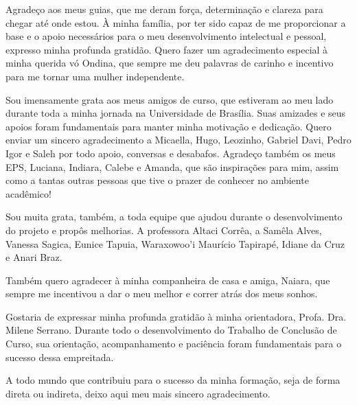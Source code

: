 \begin{agradecimentos}
    Agradeço aos meus guias, que me deram força, determinação e clareza para chegar até onde estou. À minha família, por ter sido capaz de me proporcionar a base e o apoio necessários para o meu desenvolvimento intelectual e pessoal, expresso minha profunda gratidão. Quero fazer um agradecimento especial à minha querida vó Ondina, que sempre me deu palavras de carinho e incentivo para me tornar uma mulher independente.

    Sou imensamente grata aos meus amigos de curso, que estiveram ao meu lado durante toda a minha jornada na Universidade de Brasília. Suas amizades e seus apoios foram fundamentais para manter minha motivação e dedicação. Quero enviar um sincero agradecimento a Micaella, Hugo, Leozinho, Gabriel Davi, Pedro Igor e Saleh por todo apoio, conversas e desabafos. Agradeço também os meus EPS, Luciana, Indiara, Calebe e Amanda, que são inspirações para mim, assim como a tantas outras pessoas que tive o prazer de conhecer no ambiente acadêmico!
    
    Sou muita grata, também, a toda equipe que ajudou durante o desenvolvimento do projeto e propôs melhorias. A professora Altaci Corrêa, a Samêla Alves, Vanessa Sagica, Eunice Tapuia, Waraxowoo'i Maurício Tapirapé, Idiane da Cruz e Anari Braz.

    Também quero agradecer à minha companheira de casa e amiga, Naiara, que sempre me incentivou a dar o meu melhor e correr atrás dos meus sonhos.
    
    Gostaria de expressar minha profunda gratidão à minha orientadora, Profa. Dra. Milene Serrano. Durante todo o desenvolvimento do Trabalho de Conclusão de Curso, sua orientação, acompanhamento e paciência foram fundamentais para o sucesso dessa empreitada.
    
    A todo mundo que contribuiu para o sucesso da minha formação, seja de forma direta ou indireta, deixo aqui meu mais sincero agradecimento.
\end{agradecimentos}
